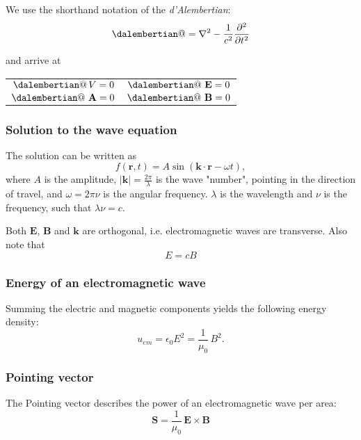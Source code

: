 \documentclass[a4paper, 12pt]{article}
\makeatletter
\renewcommand{\vec}[1]{\mathbf{#1}}
\newcommand{\E}{\ensuremath{\vec{E}}}
\newcommand{\e}{\ensuremath{\epsilon_0}}
\newcommand{\B}{\ensuremath{\vec{B}}}
\newcommand{\dalambert}{\mathop{\mathpalette\dalembertian@\relax}}
\newcommand{\dalembertian@}[2]{%
  \begingroup
  \sbox\z@{$\m@th#1\square$}%
  \dimen0=\fontdimen8
    \ifx#1\displaystyle\textfont\else
    \ifx#1\textstyle\textfont\else
    \ifx#1\scriptstyle\scriptfont\else
    \scriptscriptfont\fi\fi\fi3
  \makebox[\wd\z@]{%
    \hbox to \ht\z@{%
      \vrule width \dimen0
      \kern-\dimen0
      \vbox to \ht\z@{
        \hrule height \dimen0 width \ht\z@
        \vss
        \hrule height 2\dimen0
      }%
      \kern-2.5\dimen0
      \vrule width 2.5\dimen0
    }%
  }%
  \endgroup
}
\makeatother
\begin{document}
            We use the shorthand notation of the \textit{d'Alembertian}: 
            \begin{equation*}
                \dalambert = \nabla^2 - \frac{1}{c^2}\frac{\partial^2}{\partial t^2}
            \end{equation*}

            and arrive at
            \begin{center}
                \begin{tabular}{ c|c }
                    $\dalambert V = 0$&$ \dalambert\,\E = 0$\\
                    $\dalambert\,\vec{A} = 0 $&$\dalambert\,\B = 0$
                \end{tabular}
            \end{center}
        \subsubsection{Solution to the wave equation}
            The solution  can be written as
            \begin{equation*}
                f(\vec{r}, t) = A\sin\left(\vec{k}\cdot\vec{r} - \omega t\right),
            \end{equation*}
            where $A$ is the amplitude, $|\vec{k}| = \frac{2\pi}{\lambda}$ is the wave "number", pointing in the direction of travel, 
            and $\omega = 2\pi\nu$ is the angular frequency. $\lambda$ is the wavelength and $\nu$ is the frequency, such that
            $\lambda\nu = c$.

            Both \E, \B{} and $\vec{k}$ are orthogonal, i.e. electromagnetic waves are transverse. Also note that 
            \begin{equation}
                E = cB
            \end{equation}

        \subsubsection{Energy of an electromagnetic wave}
            Summing the electric and magnetic components yields the following energy density: 
            \begin{equation}
                u_{em} = \e E^2 = \frac{1}{\mu_0}\, B^2.
            \end{equation}
        
        \subsubsection{Pointing vector}
            The Pointing vector describes the power of an electromagnetic wave per area:
            \begin{equation}
                \vec{S} = \frac{1}{\mu_0}\,\E\times\B
            \end{equation}
\end{document}
